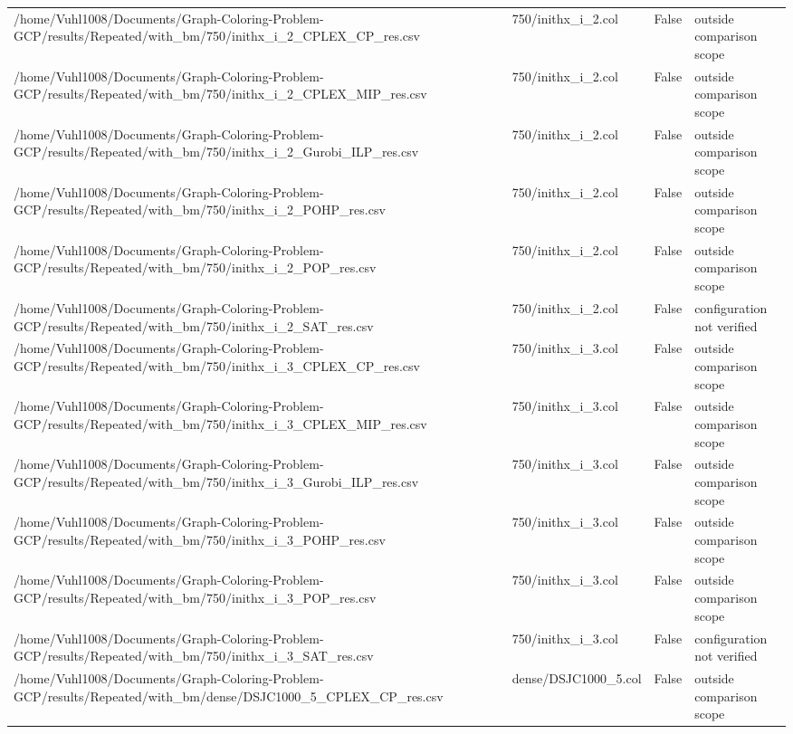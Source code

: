 \begin{table}[htbp]
\begin{tabular}{llll}
/home/Vuhl1008/Documents/Graph-Coloring-Problem-GCP/results/Repeated/with\_bm/750/inithx\_i\_2\_CPLEX\_CP\_res.csv & 750/inithx\_i\_2.col & False & outside comparison scope \\
/home/Vuhl1008/Documents/Graph-Coloring-Problem-GCP/results/Repeated/with\_bm/750/inithx\_i\_2\_CPLEX\_MIP\_res.csv & 750/inithx\_i\_2.col & False & outside comparison scope \\
/home/Vuhl1008/Documents/Graph-Coloring-Problem-GCP/results/Repeated/with\_bm/750/inithx\_i\_2\_Gurobi\_ILP\_res.csv & 750/inithx\_i\_2.col & False & outside comparison scope \\
/home/Vuhl1008/Documents/Graph-Coloring-Problem-GCP/results/Repeated/with\_bm/750/inithx\_i\_2\_POHP\_res.csv & 750/inithx\_i\_2.col & False & outside comparison scope \\
/home/Vuhl1008/Documents/Graph-Coloring-Problem-GCP/results/Repeated/with\_bm/750/inithx\_i\_2\_POP\_res.csv & 750/inithx\_i\_2.col & False & outside comparison scope \\
/home/Vuhl1008/Documents/Graph-Coloring-Problem-GCP/results/Repeated/with\_bm/750/inithx\_i\_2\_SAT\_res.csv & 750/inithx\_i\_2.col & False & configuration not verified \\
/home/Vuhl1008/Documents/Graph-Coloring-Problem-GCP/results/Repeated/with\_bm/750/inithx\_i\_3\_CPLEX\_CP\_res.csv & 750/inithx\_i\_3.col & False & outside comparison scope \\
/home/Vuhl1008/Documents/Graph-Coloring-Problem-GCP/results/Repeated/with\_bm/750/inithx\_i\_3\_CPLEX\_MIP\_res.csv & 750/inithx\_i\_3.col & False & outside comparison scope \\
/home/Vuhl1008/Documents/Graph-Coloring-Problem-GCP/results/Repeated/with\_bm/750/inithx\_i\_3\_Gurobi\_ILP\_res.csv & 750/inithx\_i\_3.col & False & outside comparison scope \\
/home/Vuhl1008/Documents/Graph-Coloring-Problem-GCP/results/Repeated/with\_bm/750/inithx\_i\_3\_POHP\_res.csv & 750/inithx\_i\_3.col & False & outside comparison scope \\
/home/Vuhl1008/Documents/Graph-Coloring-Problem-GCP/results/Repeated/with\_bm/750/inithx\_i\_3\_POP\_res.csv & 750/inithx\_i\_3.col & False & outside comparison scope \\
/home/Vuhl1008/Documents/Graph-Coloring-Problem-GCP/results/Repeated/with\_bm/750/inithx\_i\_3\_SAT\_res.csv & 750/inithx\_i\_3.col & False & configuration not verified \\
/home/Vuhl1008/Documents/Graph-Coloring-Problem-GCP/results/Repeated/with\_bm/dense/DSJC1000\_5\_CPLEX\_CP\_res.csv & dense/DSJC1000\_5.col & False & outside comparison scope \\

\end{tabular}
\end{table}
